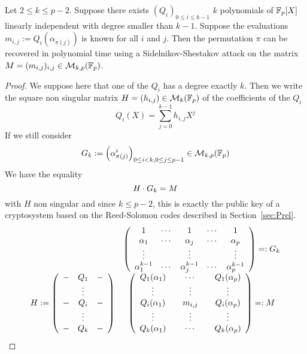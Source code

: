 \documentclass[a4paper]{article}
\newcommand{\GF}[1]{\F_{#1}}
\begin{document}
\begin{theorem}
\label{thm:link}
Let $2 \leq k \leq p-2$.
Suppose there exists $(Q_i)_{0 \leq i \leq k-1}$ $k$ polynomials of $\GF{p}[X]$ linearly independent with degree smaller than $k-1$.
Suppose the evaluations $m_{i,j} := Q_i(\alpha_{\pi(j)})$ is known for all $i$ and $j$.
Then the permutation $\pi$ can be recovered in polynomial time using a Sidelnikov-Shestakov attack on the matrix $M = (m_{i,j})_{i,j} \in \mathcal{M}_{k,p}(\GF{p})$.
\end{theorem}
\begin{proof}
We suppose here that one of the $Q_i$ has a degree exactly $k$.
Then we write the square non singular matrix $H = (h_{i,j}) \in \mathcal{M}_k(\GF{p})$ of the coefficients of the $Q_i$
$$ Q_i(X) = \sum_{j=0}^{k-1} h_{i,j} X^j $$
If we still consider
$$ \A_k := \left( \alpha_{\pi(j)}^i \right)_{0 \leq i < k, 0 \leq j \leq p-1} \in \mathcal{M}_{k,p}(\GF{p})$$
We have the equality
$$ H \cdot G_k = M$$
with $H$ non singular and since $k \leq p-2$, this is exactly the public key of a cryptosystem based on the Reed-Solomon codes described in Section~\ref{sec:Prel}.
$$
\begin{array}{ccl}
& \left( \begin{array}{ccccc}
1&\cdots&1&\cdots&1\\
\alpha_1&\cdots&\alpha_j&\cdots&\alpha_p\\
\vdots&&\vdots&&\vdots \\
\alpha_1^{k-1}&\cdots&\alpha_j^{k-1}&\cdots&\alpha_p^{k-1}
\end{array} \right) =: G_k \\
H := \left( \begin{array}{ccc}
-&Q_1&-  \\
&\vdots& \\
-&Q_i&-  \\
&\vdots& \\
-&Q_k&-
\end{array} \right) &
\left( \begin{array}{ccccc}
Q_1(\alpha_1)&&\cdots&&Q_1(\alpha_p)\\
\vdots&&\vdots&&\vdots \\
Q_i(\alpha_1)&&m_{i,j}&&Q_i(\alpha_p)\\
\vdots&&\vdots&&\vdots \\
Q_k(\alpha_1)&&\cdots&&Q_k(\alpha_p)
\end{array} \right) =: M \\
\end{array}
$$
\end{proof}
\end{document}
